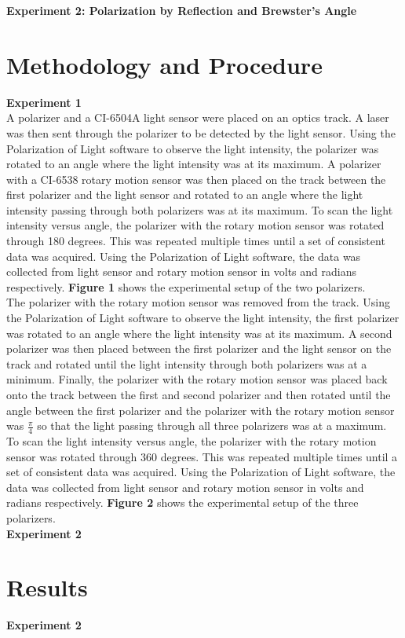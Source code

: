 \documentclass[
	letterpaper, %
	10pt, %
]{CSUniSchoolLabReport}
\begin{document}
\textbf{Experiment 2: Polarization by Reflection and Brewster’s Angle}\\
\newpage
\section{Methodology and Procedure}
\textbf{Experiment 1}\\

A polarizer and a CI-6504A light sensor were placed on an optics track. A laser was then sent through the polarizer to be detected by the light sensor. Using the Polarization of Light software to observe the light intensity, the polarizer was rotated to an angle where the light intensity was at its maximum. A polarizer with a CI-6538 rotary motion sensor was then placed on the track between the first polarizer and the light sensor and rotated to an angle where the light intensity passing through both polarizers was at its maximum. To scan the light intensity versus angle, the polarizer with the rotary motion sensor was rotated through 180 degrees. This was repeated multiple times until a set of consistent data was acquired. Using the Polarization of Light software, the data was collected from light sensor and rotary motion sensor in volts and radians respectively. \textbf{Figure 1} shows the experimental setup of the two polarizers.\\

The polarizer with the rotary motion sensor was removed from the track. Using the Polarization of Light software to observe the light intensity, the first polarizer was rotated to an angle where the light intensity was at its maximum. A second polarizer was then placed between the first polarizer and the light sensor on the track and rotated until the light intensity through both polarizers was at a minimum. Finally, the polarizer with the rotary motion sensor was placed back onto the track between the first and second polarizer and then rotated until the angle between the first polarizer and the polarizer with the rotary motion sensor was $\frac\pi4$ so that the light passing through all three polarizers was at a maximum. To scan the light intensity versus angle, the polarizer with the rotary motion sensor was rotated through 360 degrees. This was repeated multiple times until a set of consistent data was acquired. Using the Polarization of Light software, the data was collected from light sensor and rotary motion sensor in volts and radians respectively. \textbf{Figure 2} shows the experimental setup of the three polarizers.\\

\textbf{Experiment 2}
\newpage
\section{Results}
\textbf{Experiment 2}\\
\end{document}
